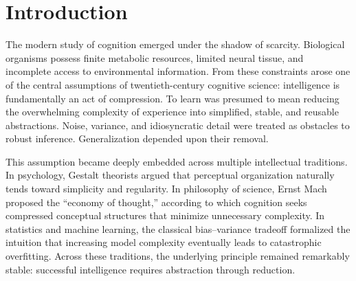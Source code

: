 \documentclass[12pt,a4paper]{article}
\begin{document}
\begin{abstract}
The framework additionally reinterprets developmental U-shaped learning, episodic memory, prototype formation, perceptual deterioration, and certain clinical dissociations as regime-dependent consequences of changing ratios between representational flexibility and experiential load. The essay further proposes that modern large-scale artificial systems and biological cognition may both operate through adaptive navigation across constrained, sufficient, and excess representational regimes. Finally, the work outlines the boundary conditions under which excess capacity succeeds or fails, emphasizing that compression remains adaptive in adversarial, metabolically constrained, or high-noise environments.

The central thesis is that intelligence should not be understood exclusively as a process of simplification. Under conditions of representational abundance, systems may achieve robust generalization precisely because they preserve and organize large quantities of experiential detail. Complexity, when guided by appropriate soft inductive biases, becomes a source of stability rather than error.

\end{abstract}
\newpage

\tableofcontents

\clearpage


\section{Introduction}

The modern study of cognition emerged under the shadow of scarcity. Biological organisms possess finite metabolic resources, limited neural tissue, and incomplete access to environmental information. From these constraints arose one of the central assumptions of twentieth-century cognitive science: intelligence is fundamentally an act of compression. To learn was presumed to mean reducing the overwhelming complexity of experience into simplified, stable, and reusable abstractions. Noise, variance, and idiosyncratic detail were treated as obstacles to robust inference. Generalization depended upon their removal.

This assumption became deeply embedded across multiple intellectual traditions. In psychology, Gestalt theorists argued that perceptual organization naturally tends toward simplicity and regularity. In philosophy of science, Ernst Mach proposed the ``economy of thought,'' according to which cognition seeks compressed conceptual structures that minimize unnecessary complexity. In statistics and machine learning, the classical bias--variance tradeoff formalized the intuition that increasing model complexity eventually leads to catastrophic overfitting. Across these traditions, the underlying principle remained remarkably stable: successful intelligence requires abstraction through reduction.
\end{document}
